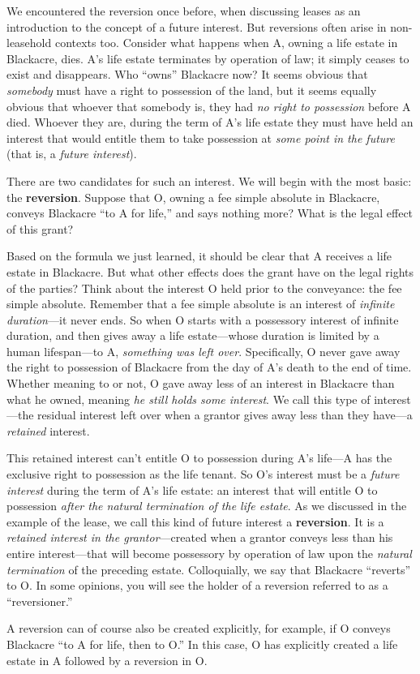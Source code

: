 We encountered the reversion once before, when discussing leases as an
introduction to the concept of a future interest. But reversions often arise in
non-leasehold contexts too. Consider what happens when A, owning a life estate
in Blackacre, dies. A's life estate terminates by operation of law; it simply
ceases to exist and disappears. Who ``owns'' Blackacre now? It seems obvious
that \textit{somebody} must have a right to possession of the land, but it
seems equally obvious that whoever that somebody is, they had \textit{no right
to possession} before A died. Whoever they are, during the term of A's life
estate they must have held an interest that would entitle them to take
possession at \textit{some point in the future} (that is, a \textit{future
interest}).

There are two candidates for such an interest. We will begin with the most
basic: the \textbf{reversion}. Suppose that O, owning a fee simple absolute in
Blackacre, conveys Blackacre ``to A for life,'' and says nothing more? What is
the legal effect of this grant?

Based on the formula we just learned, it should be clear that A receives a life
estate in Blackacre. But what other effects does the grant have on the legal
rights of the parties? Think about the interest O held prior to the conveyance:
the fee simple absolute. Remember that a fee simple absolute is an interest of
\textit{infinite duration}---it never ends. So when O starts with a
possessory interest of infinite duration, and then gives away a life
estate---whose duration is limited by a human lifespan---to A,
\textit{something was left over}. Specifically, O never gave away the right to
possession of Blackacre from the day of A's death to the end of time. Whether
meaning to or not, O gave away less of an interest in Blackacre than what he
owned, meaning \textit{he still holds some interest}. We call this type of
interest---the residual interest left over when a grantor gives away less than
they have---a \textit{retained} interest.

This retained interest can't entitle O to possession during A's life---A has the
exclusive right to possession as the life tenant. So O's interest must be a
\textit{future interest }during the term of A's life estate: an interest that
will entitle O to possession \textit{after the natural termination of the life
estate}. As we discussed in the example of the lease, we call this kind of
future interest a \textbf{reversion}. It is a \textit{retained interest in the
grantor}---created when a grantor conveys less than his entire
interest---that will become possessory by operation of law upon the
\textit{natural termination} of the preceding estate. Colloquially, we say that
Blackacre ``reverts'' to O. In some opinions, you will see the holder of a
reversion referred to as a ``reversioner.''

A reversion can of course also be created explicitly, for example, if O conveys
Blackacre ``to A for life, then to O.'' In this case, O has explicitly created
a life estate in A followed by a reversion in O.

